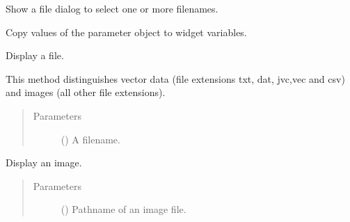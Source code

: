 \documentclass[letterpaper,10pt,english]{sphinxmanual}
\begin{document}
\begin{fulllineitems}
\begin{fulllineitems}
\label{\detokenize{openpivgui:openpivgui.OpenPivGui.OpenPivGui.select_image_files}}
Show a file dialog to select one or more filenames.

\end{fulllineitems}


\begin{fulllineitems}
\label{\detokenize{openpivgui:openpivgui.OpenPivGui.OpenPivGui.set_settings}}
Copy values of the parameter object to widget variables.

\end{fulllineitems}


\begin{fulllineitems}
\label{\detokenize{openpivgui:openpivgui.OpenPivGui.OpenPivGui.show}}
Display a file.

This method distinguishes vector data (file extensions
txt, dat, jvc,vec and csv) and images (all other file extensions).
\begin{quote}\begin{description}
\item[{Parameters}] \leavevmode
{} () \textendash{} A filename.

\end{description}\end{quote}

\end{fulllineitems}


\begin{fulllineitems}
\label{\detokenize{openpivgui:openpivgui.OpenPivGui.OpenPivGui.show_img}}
Display an image.
\begin{quote}\begin{description}
\item[{Parameters}] \leavevmode
{} () \textendash{} Pathname of an image file.


\end{description}
\end{quote}
\end{fulllineitems}
\end{fulllineitems}
\end{document}
